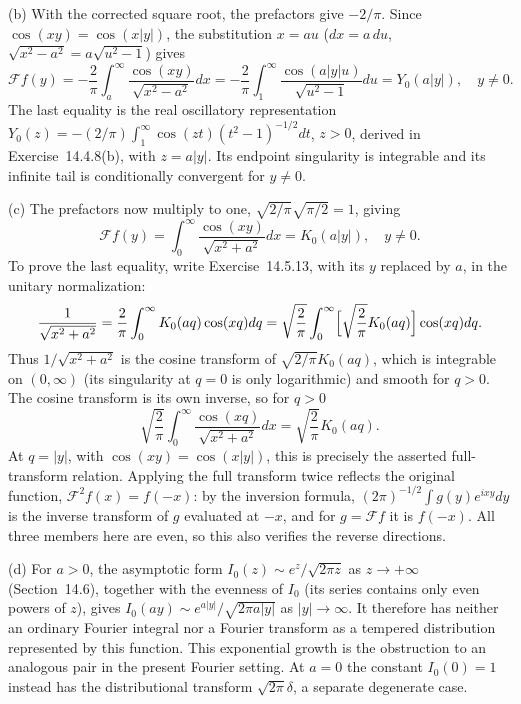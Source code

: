 (b) With the corrected square root, the prefactors give $-2/\pi$.
Since $\cos(xy)=\cos(x|y|)$, the substitution $x=au$
($dx=a\,du$, $\sqrt{x^2-a^2}=a\sqrt{u^2-1}$) gives
\[
\mathcal F f(y)=-\frac2\pi\int_a^\infty
\frac{\cos(xy)}{\sqrt{x^2-a^2}}dx
=-\frac2\pi\int_1^\infty
\frac{\cos(a|y|u)}{\sqrt{u^2-1}}du
=Y_0(a|y|),\quad y\ne0.
\]
The last equality is the real oscillatory representation
$Y_0(z)=-(2/\pi)\int_1^\infty\cos(zt)(t^2-1)^{-1/2}dt$, $z>0$,
derived in Exercise~14.4.8(b), with $z=a|y|$. Its endpoint
singularity is integrable and its infinite tail is conditionally
convergent for $y\ne0$.

(c) The prefactors now multiply to one,
$\sqrt{2/\pi}\sqrt{\pi/2}=1$, giving
\[
\mathcal F f(y)=\int_0^\infty
\frac{\cos(xy)}{\sqrt{x^2+a^2}}dx=K_0(a|y|),\quad y\ne0.
\]
To prove the last equality, write Exercise~14.5.13, with its $y$
replaced by $a$, in the unitary normalization:
\[
\frac1{\sqrt{x^2+a^2}}=\frac2\pi\int_0^\infty
K_0(aq)\cos(xq)dq
=\sqrt{\frac2\pi}\int_0^\infty
\Bigl[\sqrt{\frac2\pi}K_0(aq)\Bigr]\cos(xq)dq.
\]
Thus $1/\sqrt{x^2+a^2}$ is the cosine transform of
$\sqrt{2/\pi}K_0(aq)$, which is integrable on $(0,\infty)$ (its
singularity at $q=0$ is only logarithmic) and smooth for $q>0$.
The cosine transform is its own inverse, so for $q>0$
\[
\sqrt{\frac2\pi}\int_0^\infty\frac{\cos(xq)}{\sqrt{x^2+a^2}}dx
=\sqrt{\frac2\pi}K_0(aq).
\]
At $q=|y|$, with $\cos(xy)=\cos(x|y|)$, this is precisely the
asserted full-transform relation.
Applying the full transform twice reflects the original function,
$\mathcal F^2f(x)=f(-x)$: by the inversion formula,
$(2\pi)^{-1/2}\int g(y)e^{ixy}dy$ is the inverse transform of $g$
evaluated at $-x$, and for $g=\mathcal Ff$ it is $f(-x)$. All
three members here are even, so this also verifies the reverse
directions.

(d) For $a>0$, the asymptotic form $I_0(z)\sim e^z/\sqrt{2\pi z}$ as
$z\to+\infty$ (Section~14.6), together with the evenness of $I_0$
(its series contains only even powers of $z$), gives
$I_0(ay)\sim e^{a|y|}/\sqrt{2\pi a|y|}$ as $|y|\to\infty$.
It therefore has neither an ordinary Fourier integral nor a
Fourier transform as a tempered distribution represented by this
function. This exponential growth is the obstruction to an
analogous pair in the present Fourier setting. At $a=0$ the
constant $I_0(0)=1$ instead has the distributional transform
$\sqrt{2\pi}\delta$, a separate degenerate case.

